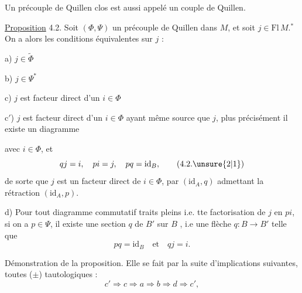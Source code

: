 
Un précouple de Quillen clos est aussi appelé un
couple de Quillen.

\uline{Proposition} 4.2. Soit $(\Phi,\Psi)$ un précouple de Quillen
dans $M$, et soit $j\in\mathrm{Fl}\,M$.$^{*}$ On a alors les conditions
équivalentes sur $j$ :

a) $j\in\widetilde\Phi$

b) $j\in\Psi^*$

c) $j$ est facteur direct d'un $i\in\Phi$

c$'$) $j$ est facteur direct d'un $i\in\Phi$ ayant
même source que $j$, plus précisément il
existe un diagramme

avec $i\in\Phi$, et
\[
qj=i,\quad pi=j,\quad pq=\mathrm{id}_B,
\tag*{(4.2.\unsure{2|1})}
\]
de sorte que $j$ est un facteur direct de $i\in\Phi$,
par $(\mathrm{id}_A,q)$ admettant la rétraction $(\mathrm{id}_A,p)$.

d) Pour tout diagramme commutatif traits pleins
i.e. tte factorisation de $j$ en $pi$, si on a
$p\in\Psi$, il existe une section $q$ de $B'$ sur $B$ ,
i.e une flèche $q:B\longrightarrow B'$ telle que
\[
pq=\mathrm{id}_B\quad\text{et}\quad qj=i.
\]

Démonstration de la proposition. Elle se fait par la
suite d'implications suivantes, toutes ($\pm$) tautologiques :
\[
c'\Longrightarrow c\Longrightarrow a\Longrightarrow b\Longrightarrow d\Longrightarrow c',
\]
